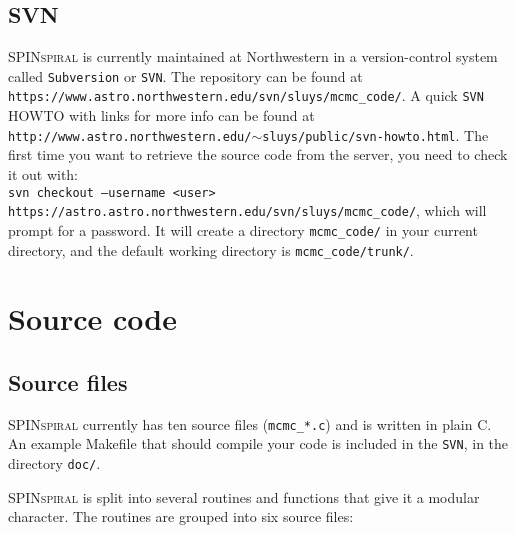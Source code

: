 \documentclass[10pt]{article}
\begin{document}
\subsection{SVN}

\textsc{SPINspiral} is currently maintained at Northwestern in a version-control system called \texttt{Subversion} or \texttt{SVN}.  The
repository can be found at \texttt{https://www.astro.northwestern.edu/svn/sluys/mcmc\_code/}.
A quick \texttt{SVN} HOWTO with links for more info can be found at \\
\texttt{http://www.astro.northwestern.edu/$\sim$sluys/public/svn-howto.html}.  
The first time you want
to retrieve the source code from the server, you need to check it out with: \\ 
\texttt{svn checkout --username <user> https://astro.astro.northwestern.edu/svn/sluys/mcmc\_code/},
which will prompt for a password.  It will create a directory \texttt{mcmc\_code/} in your current 
directory, and the default working directory is \texttt{mcmc\_code/trunk/}.




\section{Source code}

\subsection{Source files}

\textsc{SPINspiral} currently has ten source files (\texttt{mcmc\_*.c}) and is written in plain C.
An example Makefile that should compile your code is included in the \texttt{SVN}, in the directory 
\texttt{doc/}.

\textsc{SPINspiral} is split into several routines and functions that give it a modular character.
The routines are grouped into six source files:
\end{document}
